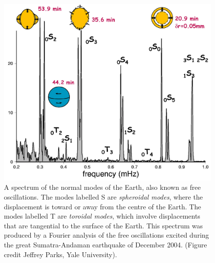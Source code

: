 \documentclass[11pt,twoside,a4paper]{article}
\begin{document}
\begin{figure}[ht]
  \centering
  \includegraphics[width=\textwidth]{../figs/L16/NormalModeSpectrum}
  \caption{A spectrum of the normal modes of the Earth, also known as
    free oscillations. The modes labelled S are \textit{spheroidal
      modes}, where the displacement is toward or away from the centre
    of the Earth. The modes labelled T are \textit{toroidal modes},
    which involve displacements that are tangential to the surface of
    the Earth.  This spectrum was produced by a Fourier analysis of
    the free oscillations excited during the great Sumatra-Andaman
    earthquake of December 2004. (Figure credit Jeffrey Parks, Yale
    University).}
  \label{fig:freeosc}
\end{figure}

\setcounter{footnote}{0}


\setcounter{footnote}{0}


\setcounter{footnote}{0}


\setcounter{footnote}{0}

\end{document}
